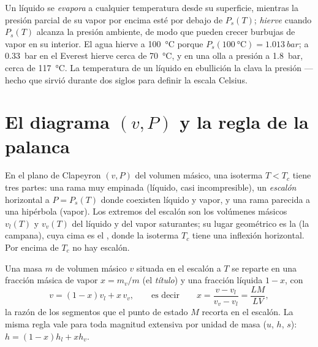 \begin{remark}\label{rem:b1:phase-changes:boiling}
Un líquido se \emph{evapora} a cualquier temperatura desde su superficie,
mientras la presión parcial de su vapor por encima esté por debajo de
$P_s(T)$; \emph{hierve} cuando $P_s(T)$ alcanza la presión ambiente, de
modo que pueden crecer burbujas de vapor en su interior. El agua hierve a
\qty{100}{\degreeCelsius} porque
$P_s(\qty{100}{\degreeCelsius}) = \qty{1.013}{bar}$; a
\qty{0.33}{bar} en el Everest hierve cerca de \qty{70}{\degreeCelsius}, y
en una olla a presión a \qty{1.8}{bar}, cerca de \qty{117}{\degreeCelsius}.
La temperatura de un líquido en ebullición la clava la presión --- hecho
que sirvió durante dos siglos para definir la escala Celsius.
\end{remark}

\section{El diagrama $(v, P)$ y la regla de la palanca}

\begin{proposition}\label{prop:b1:phase-changes:andrews}
En el plano de Clapeyron $(v, P)$ del volumen másico, una isoterma
$T < T_c$ tiene tres partes: una rama muy empinada (líquido, casi
incompresible), un \emph{escalón} horizontal a $P = P_s(T)$ donde coexisten
líquido y vapor, y una rama parecida a una hipérbola (vapor). Los
extremos del escalón son los volúmenes másicos $v_l(T)$ y $v_v(T)$ del
líquido y del vapor saturantes; su lugar geométrico es la \emph{} (la campana), cuya cima es el , donde la
isoterma $T_c$ tiene una inflexión horizontal. Por encima de $T_c$ no hay
escalón.
\end{proposition}
\admitted

\begin{theorem}\label{thm:b1:phase-changes:lever}
Una masa $m$ de volumen másico $v$ situada en el escalón a $T$ se reparte
en una fracción másica de vapor $x = m_v/m$ (el \emph{título}) y una
fracción líquida $1 - x$, con
\[
v = (1 - x)v_l + x\,v_v , \qquad\text{es decir}\qquad
x = \frac{v - v_l}{v_v - v_l} = \frac{LM}{LV} ,
\]
la razón de los segmentos que el punto de estado $M$ recorta en el
escalón. La misma regla vale para toda magnitud extensiva por unidad de
masa ($u$, $h$, $s$): $h = (1 - x)h_l + xh_v$.
\end{theorem}

